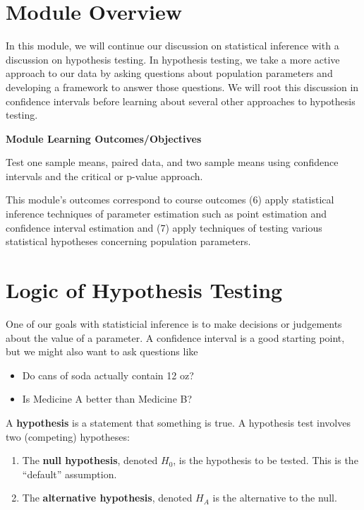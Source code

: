 \documentclass[
]{book}
\providecommand{\tightlist}{%
  \setlength{\itemsep}{0pt}\setlength{\parskip}{0pt}}
\begin{document}
\hypertarget{module-overview-5}{%
\section{Module Overview}\label{module-overview-5}}

In this module, we will continue our discussion on statistical inference with a discussion on hypothesis testing. In hypothesis testing, we take a more active approach to our data by asking questions about population parameters and developing a framework to answer those questions. We will root this discussion in confidence intervals before learning about several other approaches to hypothesis testing.

\textbf{Module Learning Outcomes/Objectives}

Test one sample means, paired data, and two sample means using confidence intervals and the critical or p-value approach.

This module's outcomes correspond to course outcomes (6) apply statistical inference techniques of parameter estimation such as point estimation and confidence interval estimation and (7) apply techniques of testing various statistical hypotheses concerning population parameters.

\hypertarget{logic-of-hypothesis-testing}{%
\section{Logic of Hypothesis Testing}\label{logic-of-hypothesis-testing}}

One of our goals with statisticial inference is to make decisions or judgements about the value of a parameter. A confidence interval is a good starting point, but we might also want to ask questions like

\begin{itemize}
\tightlist
\item
  Do cans of soda actually contain 12 oz?
\item
  Is Medicine A better than Medicine B?
\end{itemize}

A \textbf{hypothesis} is a statement that something is true. A hypothesis test involves two (competing) hypotheses:

\begin{enumerate}
\def\labelenumi{\arabic{enumi}.}
\tightlist
\item
  The \textbf{null hypothesis}, denoted \(H_0\), is the hypothesis to be tested. This is the ``default'' assumption.
\item
  The \textbf{alternative hypothesis}, denoted \(H_A\) is the alternative to the null.
\end{enumerate}
\end{document}
